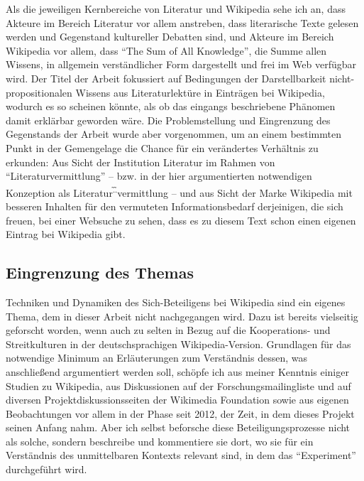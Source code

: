 \documentclass[fontsize=12pt]{scrartcl}
\begin{document}
Als die jeweiligen Kernbereiche von Li\-te\-ra\-tur\- und Wi\-ki\-pe\-dia sehe ich an, dass Akteure\textsuperscript{\tiny *} im Bereich Li\-te\-ra\-tur vor allem anstreben, dass li\-te\-ra\-rische Texte gelesen werden und Gegenstand kultureller Debatten sind, und Akteure\textsuperscript{\tiny *} im Bereich Wi\-ki\-pe\-dia vor allem, dass "`The Sum of All Know\-ledge"', die Summe allen Wissens, in allgemein verst\"andlicher Form dargestellt und frei im Web verf\"ugbar wird. Der Titel der Arbeit fokussiert auf Bedingungen der Darstellbarkeit nicht-pro\-po\-si\-ti\-o\-na\-len Wissens aus Li\-te\-ra\-tur\-lekt\"ure in Eintr\"agen bei Wi\-ki\-pe\-dia, wodurch es so scheinen k\"onnte, als ob das eingangs beschriebene Ph\"anomen damit erkl\"arbar geworden w\"are. Die Pro\-blem\-stel\-lung und Eingrenzung des Gegenstands der Arbeit wurde aber vorgenommen, um an einem bestimmten Punkt in der Gemengelage die Chance f\"ur ein ver\"andertes Verh\"altnis zu erkunden: Aus Sicht der Institution Li\-te\-ra\-tur im Rahmen von "`Li\-te\-ra\-tur\-ver\-mitt\-lung"' -- bzw. in der \mbox{hier} argumentierten notwendigen Konzeption als Li\-te\-ra\-tur\textsuperscript{\~.\~.}ver\-mitt\-lung -- und aus Sicht der Marke Wi\-ki\-pe\-dia mit besseren Inhalten f\"ur den vermuteten Informationsbedarf derjeinigen, die sich freuen, bei einer Websuche zu sehen, dass es zu diesem Text schon einen eigenen Eintrag bei Wi\-ki\-pe\-dia gibt.

\subsection{Eingrenzung des Themas}
\label{subsec:2.3}

Techniken und Dynamiken des Sich-Beteiligens bei Wi\-ki\-pe\-dia sind ein eigenes Thema, dem in dieser Arbeit nicht nachgegangen wird. Dazu ist bereits vielsei\-tig ge\-forscht worden, wenn auch zu selten in Bezug auf die Kooperations- und Streitkulturen in der deutschspra\-chi\-gen Wi\-ki\-pe\-dia-Version. Grundlagen f\"ur das notwendige Minimum an Erl\"auterungen zum Verst\"andnis dessen, was anschlie{\ss}end argumentiert werden soll, sch\"opfe ich aus meiner Kenntnis einiger Studien zu Wi\-ki\-pe\-dia, aus Dis\-kus\-sio\-nen auf der For\-schungsmailing\-liste und auf diversen Projektdis\-kus\-si\-onsseiten der Wikimedia Foundation sowie aus eigenen Beobachtungen vor allem in der Phase seit 2012, der Zeit, in dem dieses Projekt seinen Anfang nahm. Aber ich \mbox{selbst} beforsche diese Beteiligungsprozesse nicht als solche, sondern beschreibe und kommentiere sie dort, wo sie f\"ur ein Verst\"andnis des unmittelbaren Kontexts relevant sind, in dem das "`Experiment"' durchgef\"uhrt wird.
\end{document}
